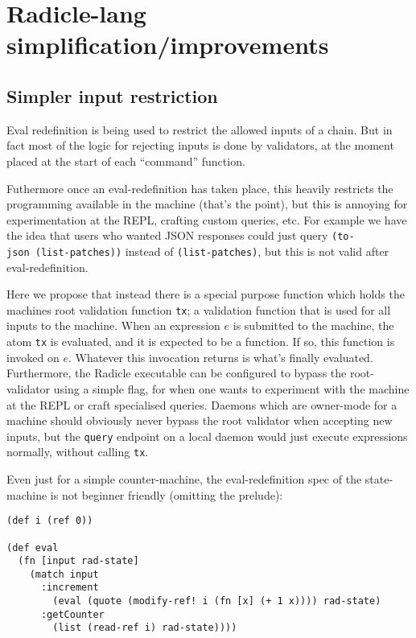 \documentclass[a4paper, oneside, 10pt]{amsart}
\begin{document}
\section{Radicle-lang simplification/improvements}\label{radicle-lang-simplificationimprovements}

\subsection{Simpler input restriction}\label{simpler-input-restriction}

Eval redefinition is being used to restrict the allowed inputs of a chain. But
in fact most of the logic for rejecting inputs is done by validators, at the
moment placed at the start of each ``command'' function.

Futhermore once an eval-redefinition has taken place, this heavily restricts the
programming available in the machine (that's the point), but this is annoying
for experimentation at the REPL, crafting custom queries, etc. For example we
have the idea that users who wanted JSON responses could just query
\texttt{(to-json\ (list-patches))} instead of \texttt{(list-patches)}, but this
is not valid after eval-redefinition.

Here we propose that instead there is a special purpose function which holds the
machines root validation function \texttt{tx}; a validation function that is
used for all inputs to the machine. When an expression $e$ is submitted to the
machine, the atom \texttt{tx} is evaluated, and it is expected to be a
function. If so, this function is invoked on $e$. Whatever this invocation
returns is what's finally evaluated. Furthermore, the Radicle executable can be
configured to bypass the root-validator using a simple flag, for when one wants
to experiment with the machine at the REPL or craft specialised queries. Daemons
which are owner-mode for a machine should obviously never bypass the root
validator when accepting new inputs, but the \texttt{query} endpoint on a local
daemon would just execute expressions normally, without calling \texttt{tx}.

Even just for a simple counter-machine, the eval-redefinition spec of the
state-machine is not beginner friendly (omitting the prelude):
\begin{lstlisting}
(def i (ref 0))

(def eval
  (fn [input rad-state]
    (match input
      :increment
        (eval (quote (modify-ref! i (fn [x] (+ 1 x)))) rad-state)
      :getCounter
        (list (read-ref i) rad-state))))
\end{lstlisting}
\end{document}
